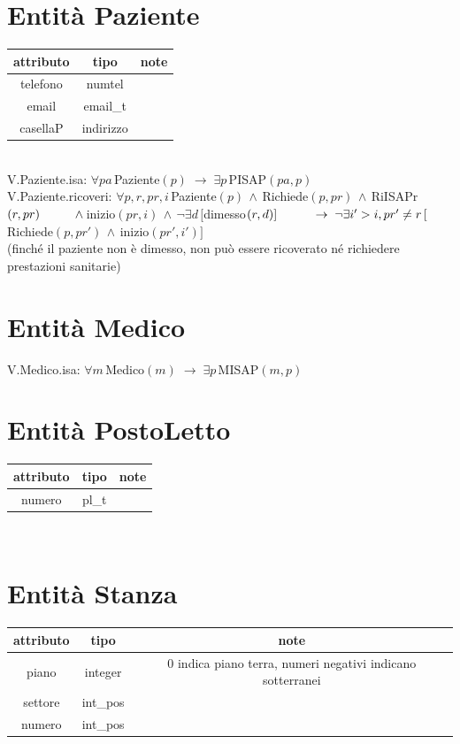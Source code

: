 \documentclass[a4paper,12pt]{report}
\begin{document}
      \section*{Entità Paziente}
        \begin{tabular}{|c|c|c|}
	        \hline attributo & tipo & note \\
	        \hline telefono & numtel & \\
	        \hline email & email\_t & \\
	        \hline casellaP & indirizzo & \\
	        \hline
        \end{tabular} \\
        V.Paziente.isa: $\forall pa \, $Paziente$(p) \;\rightarrow\; \exists p \, $PISAP$(pa, p)$ \\
        V.Paziente.ricoveri: $\forall p,r,pr,i \, $Paziente$(p) \,\wedge\, $Richiede$(p, pr) \,\wedge\, $RiISAPr$(r, pr) \\
        \hspace*{1cm}\wedge\, $inizio$(pr, i) \,\wedge\, \neg\exists d\, [$dimesso$(r, d)] \\
        \hspace*{1cm}\rightarrow\; \neg\exists i' > i,pr' \neq r \, [$Richiede$(p, pr') \,\wedge\, $inizio$(pr', i')]$ \\
        (finché il paziente non è dimesso, non può essere ricoverato né richiedere prestazioni sanitarie) \\

      \section*{Entità Medico}
        V.Medico.isa: $\forall m \, $Medico$(m) \;\rightarrow\; \exists p \, $MISAP$(m, p)$ \\

      \section*{Entità PostoLetto}
        \begin{tabular}{|c|c|c|}
	        \hline attributo & tipo & note \\
	        \hline numero & pl\_t & \\
	        \hline
        \end{tabular} \\

      \section*{Entità Stanza}
        \begin{tabular}{|c|c|c|}
	        \hline attributo & tipo & note \\
	        \hline piano & integer & 0 indica piano terra, numeri negativi indicano sotterranei \\
	        \hline settore & int\_pos & \\
	        \hline numero & int\_pos & \\
	        \hline
        \end{tabular}
\end{document}
